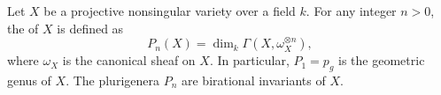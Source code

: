 Let $X$ be a projective nonsingular variety over a field $k$. For any integer $n > 0$, the  of $X$ is defined as
$$P_n(X) = \dim_k \Gamma(X, \omega_X^{\otimes n}),$$
where $\omega_X$ is the canonical sheaf on $X$. In particular, $P_1 = p_g$ is the geometric genus of $X$. The plurigenera $P_n$ are birational invariants of $X$.
